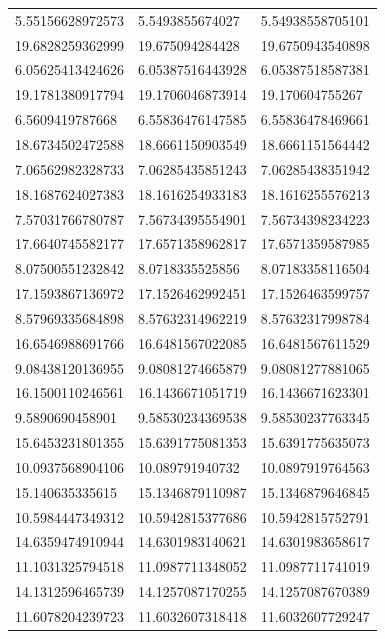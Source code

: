 \documentclass[10pt,a4paper]{article}
\begin{document}
\begin{center}
\begin{longtable}{ |p{2.8cm}|p{2.8cm}|p{2.8cm}| }
    5.55156628972573  & 5.5493855674027   & 5.54938558705101    \\
    19.6828259362999  & 19.675094284428   & 19.6750943540898    \\
    6.05625413424626  & 6.05387516443928  & 6.05387518587381    \\
    19.1781380917794  & 19.1706046873914  & 19.170604755267     \\
    6.5609419787668   & 6.55836476147585  & 6.55836478469661    \\
    18.6734502472588  & 18.6661150903549  & 18.6661151564442    \\
    7.06562982328733  & 7.06285435851243  & 7.06285438351942    \\
    18.1687624027383  & 18.1616254933183  & 18.1616255576213    \\
    7.57031766780787  & 7.56734395554901  & 7.56734398234223    \\
    17.6640745582177  & 17.6571358962817  & 17.6571359587985    \\
    8.07500551232842  & 8.0718335525856   & 8.07183358116504    \\
    17.1593867136972  & 17.1526462992451  & 17.1526463599757    \\
    8.57969335684898  & 8.57632314962219  & 8.57632317998784    \\
    16.6546988691766  & 16.6481567022085  & 16.6481567611529    \\
    9.08438120136955  & 9.08081274665879  & 9.08081277881065    \\
    16.1500110246561  & 16.1436671051719  & 16.1436671623301    \\
    9.5890690458901   & 9.58530234369538  & 9.58530237763345    \\
    15.6453231801355  & 15.6391775081353  & 15.6391775635073    \\
    10.0937568904106  & 10.089791940732   & 10.0897919764563    \\
    15.140635335615   & 15.1346879110987  & 15.1346879646845    \\
    10.5984447349312  & 10.5942815377686  & 10.5942815752791    \\
    14.6359474910944  & 14.6301983140621  & 14.6301983658617    \\
    11.1031325794518  & 11.0987711348052  & 11.0987711741019    \\
    14.1312596465739  & 14.1257087170255  & 14.1257087670389    \\
    11.6078204239723  & 11.6032607318418  & 11.6032607729247    \\

\end{longtable}
\end{center}
\end{document}
